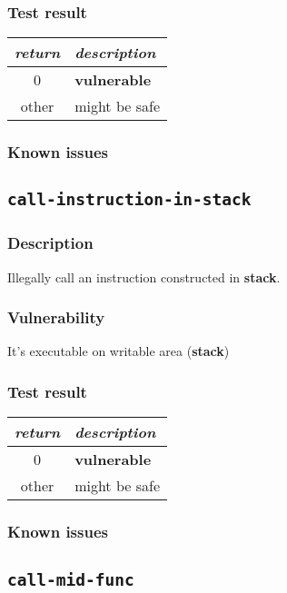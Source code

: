 \documentclass[a4paper]{book}
\begin{document}
\subsubsection{Test result}
\begin{tabular}{cl}
  \toprule
  \emph{return}  & \emph{description} \\
  \midrule
  0              & \textbf{vulnerable} \\
  other          & might be safe \\
  \bottomrule
\end{tabular}

\subsubsection{Known issues}

\newpage

\subsection{\texttt{call-instruction-in-stack}}\label{test-call-instruction-in-stack}
\subsubsection{Description}
Illegally call an instruction constructed in \textbf{stack}.
\subsubsection{Vulnerability}
It’s executable on writable area (\textbf{stack})
\subsubsection{Test result}
\begin{tabular}{cl}
  \toprule
  \emph{return}  & \emph{description} \\
  \midrule
  0              & \textbf{vulnerable} \\
  other          & might be safe \\
  \bottomrule
\end{tabular}
  
\subsubsection{Known issues}

\newpage


\subsection{\texttt{call-mid-func}}\label{test-call-mid-func}
\end{document}
